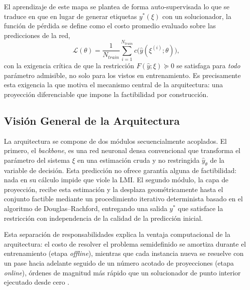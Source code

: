 El aprendizaje de este mapa se plantea de forma auto-supervisada lo que se traduce en que en lugar de 
generar etiquetas $y^*(\xi)$ con un solucionador, la función de pérdida se define como 
el costo promedio evaluado sobre las predicciones de la red,
\begin{equation}
    \mathcal{L}(\theta) = \frac{1}{N_{train}} \sum_{i=1}^{N_{train}} 
    c\big(\hat{y}(\xi^{(i)}; \theta)\big),
    \label{eq:loss_autosupervisada}
\end{equation}
con la exigencia crítica de que la restricción $F(\hat{y};\xi) \succeq 0$ se satisfaga 
para \emph{todo} parámetro admisible, no solo para los vistos en entrenamiento. Es 
precisamente esta exigencia la que motiva el mecanismo central de la arquitectura: una 
proyección diferenciable que impone la factibilidad por construcción.







\subsection{Visión General de la Arquitectura}
\label{subsec:vision_general}

La arquitectura se compone de dos módulos secuencialmente acoplados. El primero, el 
\textit{backbone}, es una red neuronal densa convencional que transforma el parámetro 
del sistema $\xi$ en una estimación cruda y no restringida $\hat{y}_\theta$ de la 
variable de decisión. Esta predicción no ofrece garantía alguna de factibilidad: nada 
en su cálculo impide que viole la LMI. El segundo módulo, la capa de 
proyección, recibe esta estimación y la desplaza geométricamente hasta el conjunto 
factible mediante un procedimiento iterativo determinista basado en el algoritmo de 
Douglas--Rachford, entregando una salida $y^*$ que satisface la restricción con independencia de la calidad de la predicción inicial.

Esta separación de responsabilidades explica la ventaja computacional de la 
arquitectura: el costo de resolver el problema semidefinido se amortiza durante el 
entrenamiento (etapa \textit{offline}), mientras que cada instancia nueva se resuelve 
con un pase hacia adelante seguido de un número acotado de proyecciones (etapa 
\textit{online}), órdenes de magnitud más rápido que un solucionador de punto interior 
ejecutado desde cero \cite{tang2026lminet}.

